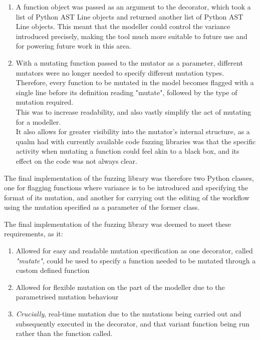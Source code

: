 \begin{enumerate}
    \item A function object was passed as an argument to the decorator, which took a list of Python AST Line objects and returned another list of Python AST Line objects. This meant that the modeller could control the variance introduced precisely, making the tool much more suitable to future use and for powering future work in this area.
    \item With a mutating function passed to the mutator as a parameter, different mutators were no longer needed to specify different mutation types. Therefore, every function to be mutated in the model becomes flagged with a single line before its definition reading "mutate", followed by the type of mutation required.\\This was to increase readability, and also vastly simplify the act of mutating for a modeller.\\It also allows for greater visibility into the mutator's internal structure, as a qualm had with currently available code fuzzing libraries was that the specific activity when mutating a function could feel akin to a black box, and its effect on the code was not always clear.
\end{enumerate}\par

The final implementation of the fuzzing library was therefore two Python classes, one for flagging functions where variance is to be introduced and specifying the format of its mutation, and another for carrying out the editing of the workflow using the mutation specified as a parameter of the former class.\par
The final implementation of the fuzzing library was deemed to meet these requirements, as it: 
\begin{enumerate}  %
    \item Allowed for easy and readable mutation specification as one decorator, called \emph{"mutate"}, could be used to specify a function needed to be mutated through a custom defined function
    \item Allowed for flexible mutation on the part of the modeller due to the parametrised mutation behaviour
    \item \emph{Crucially}, real-time mutation due to the mutations being carried out and subsequently executed in the decorator, and that variant function being run rather than the function called.
\end{enumerate} \par

